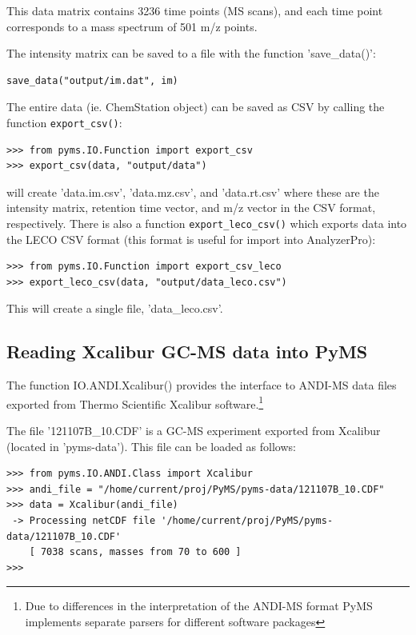 \noindent
This data matrix contains 3236 time points (MS scans), and each time point
corresponds to a mass spectrum of 501 m/z points.

The intensity matrix can be saved to a file with the function 'save\_data()':

\begin{verbatim}
save_data("output/im.dat", im)
\end{verbatim}

The entire data (ie. ChemStation object) can be saved as CSV by
calling the function {\tt export\_csv()}:

\begin{verbatim}
>>> from pyms.IO.Function import export_csv
>>> export_csv(data, "output/data")
\end{verbatim}

\noindent
will create 'data.im.csv', 'data.mz.csv', and 'data.rt.csv' where these
are the intensity matrix, retention time vector, and m/z vector in the
CSV format, respectively.
There is also a function {\tt export\_leco\_csv()} which exports data
into the LECO CSV format (this format is useful for import into
AnalyzerPro):

\begin{verbatim}
>>> from pyms.IO.Function import export_csv_leco
>>> export_leco_csv(data, "output/data_leco.csv")
\end{verbatim}

\noindent
This will create a single file, 'data\_leco.csv'.

\subsection{Reading Xcalibur GC-MS data into PyMS}


The function IO.ANDI.Xcalibur() provides the interface to ANDI-MS data files
exported from Thermo Scientific Xcalibur software.\footnote{Due to differences
in the interpretation of the ANDI-MS format PyMS implements separate parsers
for different software packages}

The file '121107B\_10.CDF' is a GC-MS experiment exported from Xcalibur (located
in 'pyms-data'). This file can be loaded as follows:

\begin{verbatim}
>>> from pyms.IO.ANDI.Class import Xcalibur
>>> andi_file = "/home/current/proj/PyMS/pyms-data/121107B_10.CDF"
>>> data = Xcalibur(andi_file)
 -> Processing netCDF file '/home/current/proj/PyMS/pyms-data/121107B_10.CDF'
    [ 7038 scans, masses from 70 to 600 ]
>>>
\end{verbatim}

